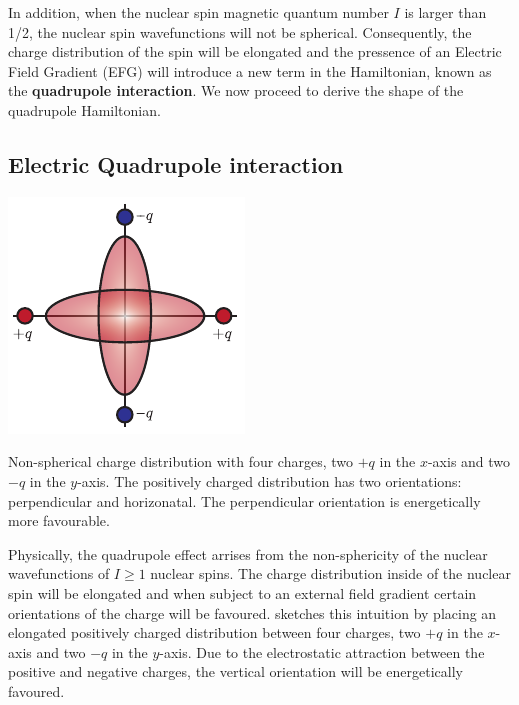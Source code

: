 In addition, when the nuclear spin magnetic quantum number $I$ is larger than 1/2, the nuclear spin wavefunctions will not be spherical. Consequently, the charge distribution of the spin will be elongated and the pressence of an Electric Field Gradient (EFG) will introduce a new term in the Hamiltonian, known as the \textbf{quadrupole interaction}. We now proceed to derive the shape of the quadrupole Hamiltonian. 

\subsection{Electric Quadrupole interaction}


\begin{marginfigure}
    \includegraphics{chapter2/figures/charge_orientatons.pdf}
    \caption[Quadrupole charge diagram]{Non-spherical charge distribution with four charges, two $+q$ in the $x$-axis and two $-q$ in the $y$-axis. The positively charged distribution has two orientations: perpendicular and horizonatal. The perpendicular orientation is energetically more favourable.}
\end{marginfigure}

Physically, the quadrupole effect arrises from the non-sphericity of the nuclear wavefunctions of $I\geq1$ nuclear spins. The charge distribution inside of the nuclear spin will be elongated and when subject to an external field gradient certain orientations of the charge will be favoured.  sketches this intuition by placing an elongated positively charged distribution between four charges, two $+q$ in the $x$-axis and two $-q$ in the $y$-axis. Due to the electrostatic attraction between the positive and negative charges, the vertical orientation will be energetically favoured.

